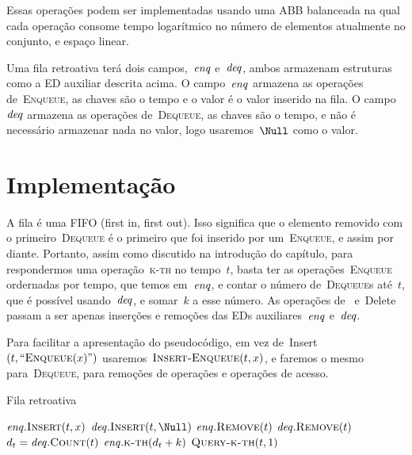 \documentclass[main.tex]{subfiles}
\begin{document}
Essas operações podem ser implementadas usando uma ABB balanceada na qual cada operação consome tempo logarítmico no número de elementos atualmente no conjunto, e espaço linear.

\newcommand{\deqs}{\V{deq}}
\newcommand{\enqs}{\V{enq}}

Uma fila retroativa terá dois campos,~$\enqs$ e~$\deqs$, ambos armazenam estruturas como a ED auxiliar descrita acima. O campo~$\enqs$ armazena as operações de~\textsc{Enqueue}, as chaves são o tempo e o valor é o valor inserido na fila. O campo~$\deqs$ armazena as operações de~\textsc{Dequeue}, as chaves são o tempo, e não é necessário armazenar nada no valor, logo usaremos~$\Null$ como o valor.

\section{Implementação}

A fila é uma FIFO (first in, first out). Isso significa que o elemento removido com o primeiro~\textsc{Dequeue} é o primeiro que foi inserido por um~\textsc{Enqueue}, e assim por diante. Portanto, assim como discutido na introdução do capítulo, para respondermos uma operação~\textsc{k-th} no tempo~$t$, basta ter as operações~\textsc{Enqueue} ordernadas por tempo, que temos em~$\enqs$, e contar o número de~\textsc{Dequeue}s até~$t$, que é possível usando~$\deqs$, e somar~$k$ a esse número. As operações de~ e~Delete passam a ser apenas inserções e remoções das EDs auxiliares~$\enqs$ e~$\deqs$.

Para facilitar a apresentação do pseudocódigo, em vez de~Insert$(t, ``\Call{Enqueue}{x}")$ usaremos~$\Call{Insert-Enqueue}{t, x}$, e faremos o mesmo para~\textsc{Dequeue}, para remoções de operações e operações de acesso.

\begin{algorithm}
\caption{Fila retroativa} \label{lst:filaretro}
\begin{algorithmic}[1]
		\State $\enqs.\Call{Insert}{t, x}$
	\EndFunction
		\State $\deqs.\Call{Insert}{t, \Null}$
	\EndFunction
		\State $\enqs.\Call{Remove}{t}$
	\EndFunction
		\State $\deqs.\Call{Remove}{t}$
	\EndFunction
		\State $d_t = \deqs.\Call{Count}{t}$ 
		\State \Return $\enqs.\Call{k-th}{d_t + k}$
	\EndFunction
		\State \Return $\Call{Query-k-th}{t, 1}$
	\EndFunction
\end{algorithmic}
\end{algorithm}
\end{document}
